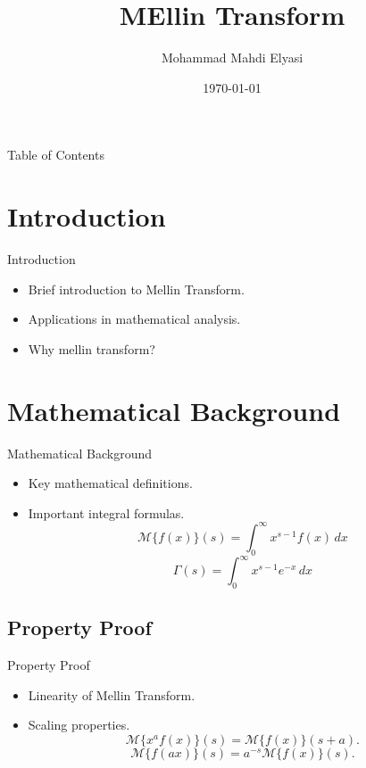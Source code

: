 \documentclass{beamer}
\title[Mellin Transform]{MEllin Transform}
\author[]{Mohammad Mahdi Elyasi}
\institute[Amirkabir University of Techonology]{
    Supervisor: Dr. Moradi \\[1cm] %
    Faculty of Electrical Engineering \\ %
}
\date{\today} %
\begin{document}
\begin{frame}
    
    \titlepage
\end{frame}

\begin{frame}{Table of Contents}
    \tableofcontents
\end{frame}

\section{Introduction}
\begin{frame}{Introduction}
    \begin{itemize}
        \item Brief introduction to Mellin Transform.
        \item Applications in mathematical analysis.
        \item Why mellin transform?
    \end{itemize}
\end{frame}

\section{Mathematical Background}
\begin{frame}{Mathematical Background}
    \begin{itemize}
        \item Key mathematical definitions.
        \item Important integral formulas.
        \begin{equation}
            \mathcal{M}\{f(x)\}(s) = \int_{0}^{\infty} x^{s-1} f(x) \, dx
        \end{equation}
        \begin{equation}
            \Gamma(s) = \int_{0}^{\infty} x^{s-1} e^{-x} \, dx
        \end{equation}
        
    \end{itemize}
\end{frame}


\subsection{Property Proof}
\begin{frame}{Property Proof}
    \begin{itemize}
        \item Linearity of Mellin Transform.
        \item Scaling properties.
        \begin{equation}
            \mathcal{M}\{x^a f(x)\}(s) = \mathcal{M}\{f(x)\}(s + a).
        \end{equation}
        \begin{equation}
            \mathcal{M}\{f(ax)\}(s) = a^{-s} \mathcal{M}\{f(x)\}(s).
        \end{equation}
    \end{itemize}
\end{frame}
\end{document}
